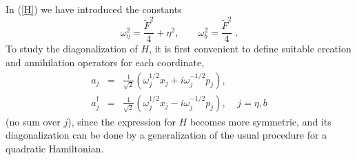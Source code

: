 \documentclass[a4paper,12pt]{article}
\newcommand{\Fd}{\widetilde{F}}
\newcommand{\n}{\eta}
\newcommand{\w}{\omega}
\begin{document}
In (\ref{H}) we have introduced the constants
\begin{equation}\label{w}
\w_\n^2=\frac{\Fd^2}{4}+\n^2,\;\;\;\;\;\;\;\w_b^2=\frac{\Fd^2}{4}\;.
\end{equation}
To study the diagonalization of $H$, it is first convenient to define
suitable creation and annihilation operators for each coordinate,
\begin{eqnarray}\label{a}
a_j&=&\frac{1}{\sqrt{2}}(\w_j^{1/2}x_j+i\w_j^{-1/2}p_j)
\nonumber,\\
a_j^\dagger&=&\frac{1}{\sqrt{2}}(\w_j^{1/2}x_j-i\w_j^{-1/2}p_j),\;\;\;\;
j=\n,b
\end{eqnarray}
(no sum over $j$), since the expression for $H$ becomes more
symmetric, and its diagonalization can be done by a generalization of
the usual procedure for a quadratic Hamiltonian.
  
\end{document}
